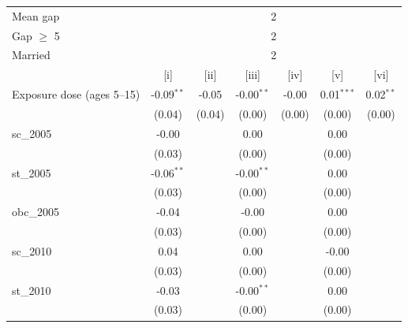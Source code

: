 {\centering\scriptsize
\begingroup
\begin{tabular}{@{}lcccccc@{}}
   \toprule
   Mean gap & \multicolumn{6}{c}{2} \\ 
   Gap $\geq$ 5 & \multicolumn{6}{c}{2} \\ 
   Married & \multicolumn{6}{c}{2} \\ 
                                                    & [i]           & [ii]          & [iii]         & [iv]          & [v]           & [vi]\\  
   \midrule 
   Exposure dose (ages 5--15)                       & -0.09$^{**}$  & -0.05         & -0.00$^{**}$ & -0.00        & 0.01$^{***}$  & 0.02$^{**}$\\   
                                                    & (0.04)        & (0.04)        & (0.00)       & (0.00)       & (0.00)       & (0.00)\\   
   sc\_2005                                         & -0.00        &               & 0.00         &               & 0.00         &   \\   
                                                    & (0.03)        &               & (0.00)       &               & (0.00)       &   \\   
   st\_2005                                         & -0.06$^{**}$  &               & -0.00$^{**}$ &               & 0.00         &   \\   
                                                    & (0.03)        &               & (0.00)       &               & (0.00)       &   \\   
   obc\_2005                                        & -0.04         &               & -0.00        &               & 0.00         &   \\   
                                                    & (0.03)        &               & (0.00)       &               & (0.00)       &   \\   
   sc\_2010                                         & 0.04          &               & 0.00         &               & -0.00        &   \\   
                                                    & (0.03)        &               & (0.00)       &               & (0.00)       &   \\   
   st\_2010                                         & -0.03         &               & -0.00$^{**}$ &               & 0.00         &   \\   
                                                    & (0.03)        &               & (0.00)       &               & (0.00)       &   \\   

\end{tabular}}
